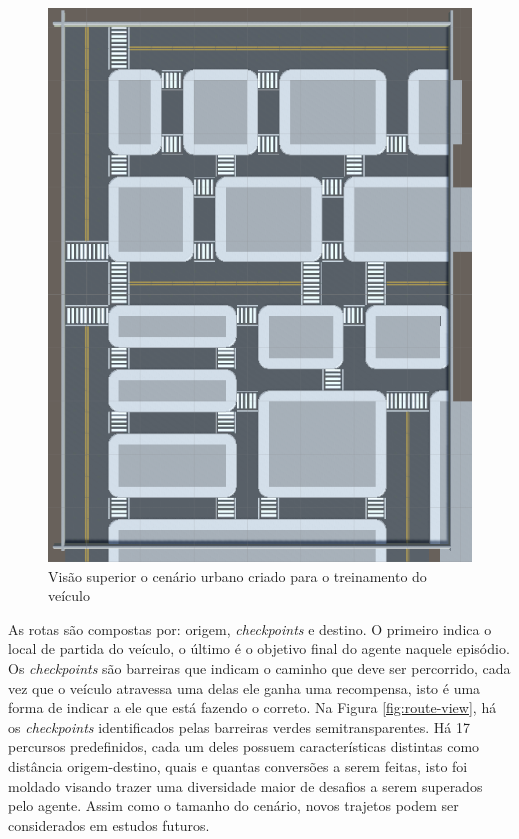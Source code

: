 \begin{figure}[h]
   \centering
   \includegraphics[scale=0.45, angle=90]{figs/Mapa-simulador-visao-superior.png}
    \caption{Visão superior o cenário urbano criado para o treinamento do veículo}
    \label{fig:map-view}
 \end{figure}

As rotas são compostas por: origem, \textit{checkpoints} e destino. O primeiro indica o local de partida do veículo, o último é o objetivo final do agente naquele episódio. Os \textit{checkpoints} são barreiras que indicam o caminho que deve ser percorrido, cada vez que o veículo atravessa uma delas ele ganha uma recompensa, isto é uma forma de indicar a ele que está fazendo o correto. Na Figura \ref{fig:route-view}, há os \textit{checkpoints} identificados pelas barreiras verdes semitransparentes. Há 17 percursos predefinidos, cada um deles possuem características distintas como distância origem-destino, quais e quantas conversões a serem feitas, isto foi moldado visando trazer uma diversidade maior de desafios a serem superados pelo agente. Assim como o tamanho do cenário, novos trajetos podem ser considerados em estudos futuros.

